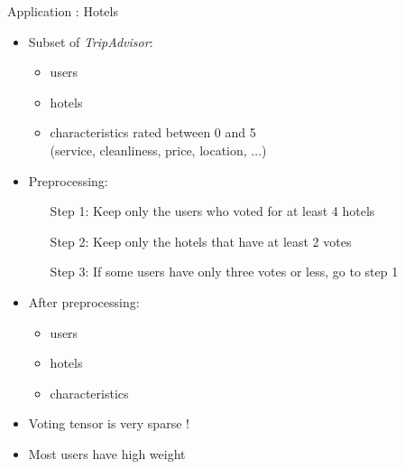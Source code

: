 \begin{frame}{Application : Hotels}
\begin{itemize}
    \item Subset of \textit{TripAdvisor}:
    \begin{itemize}
        \item {} users
        \item {} hotels
        \item {} characteristics rated between 0 and 5\\ (service, cleanliness, price, location, $\dots$)
    \end{itemize}
    \item Preprocessing:
    \begin{itemize}
        \item[Step 1:] Keep only the users who voted for at least 4 hotels
        \item[Step 2:] Keep only the hotels that have at least 2 votes
        \item[Step 3:] If some users have only three votes or less, go to step 1
    \end{itemize}
    \item After preprocessing:
    \begin{itemize}
        \item {} users
        \item {} hotels
        \item {} characteristics
    \end{itemize}
    \item Voting tensor is very sparse !
    \item Most users have high weight
\end{itemize}
\end{frame}


